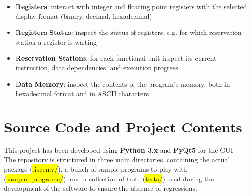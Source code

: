 \documentclass[12pt]{article}
\begin{document}
\begin{itemize}
\begin{itemize}
        \item \textbf{Registers}: interact with integer and floating point registers with the selected display format (binary, decimal, hexadecimal)
        \item \textbf{Registers Status}: inspect the status of registers, e.g. for which reservation station a register is waiting
        \item \textbf{Reservation Stations}: for each functional unit inspect its current instruction, data dependencies, and execution progress
        \item \textbf{Data Memory}: inspect the contents of the program’s memory, both in hexadecimal format and in ASCII characters
    \end{itemize}
\end{itemize}


\section{Source Code and Project Contents}
This project has been developed using \textbf{Python 3.x} and \textbf{PyQt5} for the GUI. The repository is structured in three main directories, containing the actual package (\hl{riscemv/}), a bunch of sample programs to play with (\hl{sample\_programs/}), and a collection of tests (\hl{tests/}) used during the development of the software to ensure the absence of regressions.\\
\end{document}
